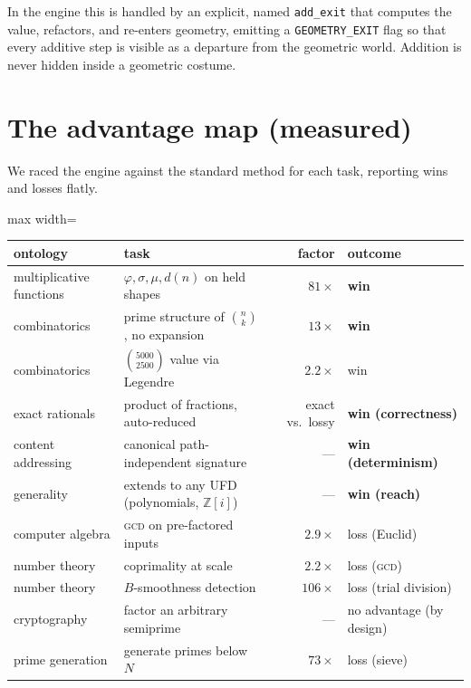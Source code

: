 \documentclass[11pt]{article}
\begin{document}
In the engine this is handled by an explicit, named \texttt{add\_exit} that computes the value, refactors,
and re-enters geometry, emitting a \texttt{GEOMETRY\_EXIT} flag so that every additive step is visible as a
departure from the geometric world. Addition is never hidden inside a geometric costume.

\section{The advantage map (measured)}

We raced the engine against the standard method for each task, reporting wins and losses flatly.

\begin{center}
\begin{adjustbox}{max width=\linewidth}\begin{tabular}{llrl}
\toprule
ontology & task & factor & outcome \\
\midrule
multiplicative functions & $\varphi,\sigma,\mu,d(n)$ on held shapes & $81\times$ & \textbf{win} \\
combinatorics & prime structure of $\binom{n}{k}$, no expansion & $13\times$ & \textbf{win} \\
combinatorics & $\binom{5000}{2500}$ value via Legendre & $2.2\times$ & win \\
exact rationals & product of fractions, auto-reduced & exact vs.\ lossy & \textbf{win (correctness)} \\
content addressing & canonical path-independent signature & --- & \textbf{win (determinism)} \\
generality & extends to any UFD (polynomials, $\mathbb{Z}[i]$) & --- & \textbf{win (reach)} \\
computer algebra & \textsc{gcd} on pre-factored inputs & $2.9\times$ & loss (Euclid) \\
number theory & coprimality at scale & $2.2\times$ & loss (\textsc{gcd}) \\
number theory & $B$-smoothness detection & $106\times$ & loss (trial division) \\
cryptography & factor an arbitrary semiprime & --- & no advantage (by design) \\
prime generation & generate primes below $N$ & $73\times$ & loss (sieve) \\
\bottomrule
\end{tabular}\end{adjustbox}
\end{center}
\end{document}
